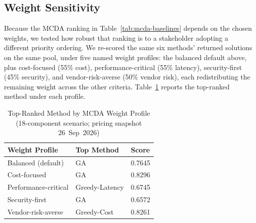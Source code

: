 \documentclass[journal]{IEEEtran}
\begin{document}
\subsection{Weight Sensitivity}
\label{sec:mcdasensitivity}

Because the MCDA ranking in Table~\ref{tab:mcda-baselines} depends on the
chosen weights, we tested how robust that ranking is to a stakeholder
adopting a different priority ordering. We re-scored the same six methods'
returned solutions on the same pool, under five named weight profiles: the
balanced default above, plus cost-focused (55\% cost), performance-critical
(55\% latency), security-first (45\% security), and vendor-risk-averse (50\%
vendor risk), each redistributing the remaining weight across the other
criteria. Table~\ref{tab:mcda-sensitivity} reports the top-ranked method under
each profile.

\begin{table}[t]
\centering
\caption{Top-Ranked Method by MCDA Weight Profile (18-component scenario;
pricing snapshot 26~Sep~2026)}
\label{tab:mcda-sensitivity}
\begin{tabular}{@{}lll@{}}
\toprule
Weight Profile          & Top Method    & Score \\
\midrule
Balanced (default)      & GA            & 0.7645 \\
Cost-focused            & GA            & 0.8296 \\
Performance-critical    & Greedy-Latency & 0.6745 \\
Security-first          & GA            & 0.6572 \\
Vendor-risk-averse      & Greedy-Cost   & 0.8261 \\
\bottomrule
\end{tabular}
\end{table}
\end{document}
